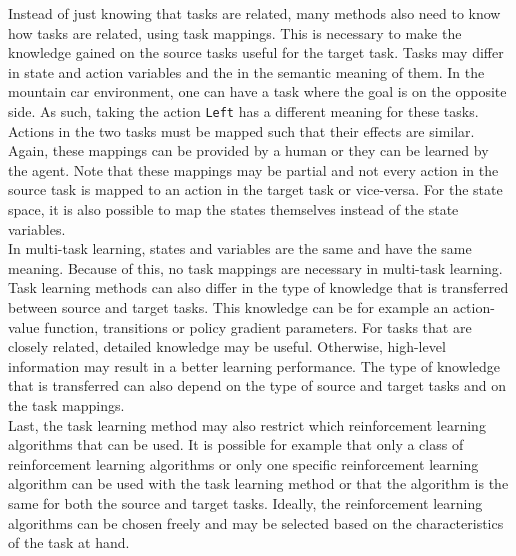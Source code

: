 Instead of just knowing that tasks are related, many methods also need to know how tasks are related, using task mappings. This is necessary to make the knowledge gained on the source tasks useful for the target task. Tasks may differ in state and action variables and the in the semantic meaning of them. In the mountain car environment, one can have a task where the goal is on the opposite side. As such, taking the action \texttt{Left} has a different meaning for these tasks. Actions in the two tasks must be mapped such that their effects are similar.\\
Again, these mappings can be provided by a human or they can be learned by the agent. Note that these mappings may be partial and not every action in the source task is mapped to an action in the target task or vice-versa. For the state space, it is also possible to map the states themselves instead of the state variables.\\
In multi-task learning, states and variables are the same and have the same meaning. Because of this, no task mappings are necessary in multi-task learning.\\

Task learning methods can also differ in the type of knowledge that is transferred between source and target tasks. This knowledge can be for example an action-value function, transitions or policy gradient parameters. For tasks that are closely related, detailed knowledge may be useful. Otherwise, high-level information may result in a better learning performance. The type of knowledge that is transferred can also depend on the type of source and target tasks and on the task mappings.\\

Last, the task learning method may also restrict which reinforcement learning algorithms that can be used. It is possible for example that only a class of reinforcement learning algorithms or only one specific reinforcement learning algorithm can be used with the task learning method or that the algorithm is the same for both the source and target tasks. Ideally, the reinforcement learning algorithms can be chosen freely and may be selected based on the characteristics of the task at hand.\\

